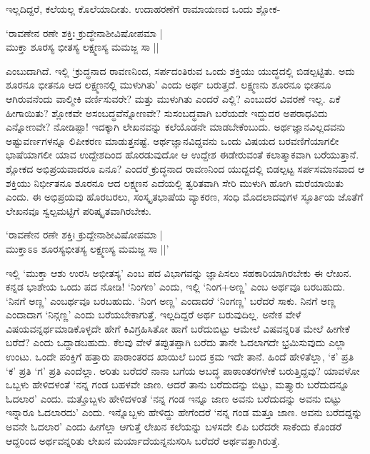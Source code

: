ಇಲ್ಲದಿದ್ದರೆ, ಕಲೆಯಲ್ಲ ಕೊಲೆಯಾದೀತು. ಉದಾಹರಣೆಗೆ ರಾಮಾಯಣದ ಒಂದು ಶ್ಲೋಕ-

\begin{shloka}
`ರಾವಣೇನ ರಣೇ ಶಕ್ತಿಃ ಕ್ರುದ್ಧೇನಾಶೀವಿಷೋಪಮಾ |\label{120}\\
ಮುಕ್ತಾ ಶೂರಸ್ಯ ಭೀತಸ್ಯ ಲಕ್ಷ್ಮಣಸ್ಯ ಮಮಜ್ಜ ಸಾ ||
\end{shloka}
ಎಂಬುದಾಗಿದೆ. ಇಲ್ಲಿ `ಕ್ರುದ್ಧನಾದ ರಾವಣನಿಂದ, ಸರ್ಪದಂತಿರುವ ಒಂದು ಶಕ್ತಿಯು ಯುದ್ಧದಲ್ಲಿ ಬಿಡಲ್ಪಟ್ಟಿತು. ಅದು ಶೂರನೂ ಭೀತನೂ ಆದ ಲಕ್ಷ್ಮಣನಲ್ಲಿ ಮುಳುಗಿತು' ಎಂದು ಅರ್ಥ ಬರುತ್ತದೆ. ಲಕ್ಷ್ಮಣನು ಶೂರನೂ ಭೀತನೂ ಆಗಿರುವನೆಂದು ವಾಲ್ಮೀಕಿ ವರ್ಣಿಸುವರೇ? ಮತ್ತು ಮುಳುಗಿತು ಎಂದರೆ ಎಲ್ಲಿ? ಎಂಬುದರ ವಿವರಣೆ ಇಲ್ಲ. ಏಕೆ ಹೀಗಾಯಿತು? ಶ್ಲೋಕವೇ ಅಸಂಬದ್ಧವೆನ್ನೋಣವೇ? ಸುಸಂಬದ್ಧವಾಗಿ ಬರೆಯದೇ ಇದ್ದುದರ ಅಪರಾಧವಿದು ಎನ್ನೋಣವೇ? ನೋಡಿಪ್ಪಾ! ಇದಕ್ಕಾಗಿ ಲೇಖನವನ್ನು ಕಲೆಯೊಡನೇ ಮಾಡಬೇಕೆಂಬುದು. ಅರ್ಥಜ್ಞಾನವಿಲ್ಲದವನು ಅಷ್ಟುವರ್ಣಗಳನ್ನೂ ಲಿಪೀಕರಣ ಮಾಡುತ್ತನಷ್ಟೆ. ಅರ್ಥಜ್ಞಾನವಿದ್ದವನು ಒಂದು ವಿಷಯದ ಬರವಣಿಗೆಯಾಗಲೀ ಭಾಷೆಯಾಗಲೀ ಯಾವ ಉದ್ದೇಶದಿಂದ  ಹೊರಡುವುದೋ ಆ ಉದ್ದೇಶ ಈಡೇರುವಂತೆ ಕಲಾತ್ಮಾಕವಾಗಿ ಬರೆಯುತ್ತಾನೆ. ಶ್ಲೋಕದ ಅಭಿಪ್ರಯವಾದರೂ ಏನೂ? ಎಂದರೆ ಕ್ರುದ್ಧನಾದ ರಾವಣನಿಂದ ಯುದ್ದದಲ್ಲಿ ಬಿಡಲ್ಪಟ್ಟ ಸರ್ಪಸಮಾನವಾದ ಆ ಶಕ್ತಿಯು ನಿರ್ಭೀತನೂ ಶೂರನೂ ಆದ ಲಕ್ಷ್ಮಣನ ಎದೆಯಲ್ಲಿ ತ್ವರಿತವಾಗಿ ಸೇರಿ ಮುಳುಗಿ ಹೋಗಿ ಮರೆಯಾಯಿತು ಎಂದು. ಈ ಅಭಿಪ್ರಯವು ಹೊರಬರಲು, ಸಂಸ್ಕೃತಭಾಷೆಯ ವ್ಯಾಕರಣ, ಸಂಧಿ ಮೊದಲಾದವುಗಳ ಸ್ಫೂರ್ತಿಯ ಜೊತೆಗೆ ಲೇಖನವೂ ಸ್ವಲ್ಪಮಟ್ಟಿಗೆ ಪರಿಷ್ಕೃತವಾಗಿರಬೇಕು.

\begin{shloka}
`ರಾವಣೇನ ರಣೇ ಶಕ್ತಿಃ ಕ್ರುದ್ದೇನಾಶೀವಿಷೋಪಮಾ |\\
ಮುಕ್ತಾಽಽ ಶೂರಸ್ಯಭೀತಸ್ಯ ಲಕ್ಷ್ಮಣಸ್ಯ ಮಮಜ್ಜ ಸಾ ||'
\end{shloka}
ಇಲ್ಲಿ `ಮುಕ್ತಾ ಆಶು ಉರಸಿ ಅಭೀತಸ್ಯ' ಎಂಬ ಪದ ವಿಭಾಗವನ್ನು ಜ್ಞಾಪಿಸಲು ಸಹಕಾರಿಯಾಗಿರಬೇಕು ಈ ಲೇಖನ. ಕನ್ನಡ ಭಾಶೇಯ ಒಂದು ಪದ ನೋಡಿ! `ನಿಂಗಣ' ಎಂದು, ಇಲ್ಲಿ  `ನಿಂಗ+ಅಣ್ಣ' ಎಂಬ ಅರ್ಥವೂ ಬರಬಹುದು. `ನಿನಗೆ ಅಣ್ಣ' ಎಂಬರ್ಥವೂ‌ ಬರಬಹುದು. `ನಿಂಗ ಅಣ್ಣ' ಎಂದಾದರೆ `ನಿಂಗಣ್ಣ' ಬರೆದರೆ ಸಾಕು. ನಿನಗೆ ಅಣ್ಣ ಎಂದಾದಾಗ `ನಿನ್ಗಣ್ಣ' ಎಂದು ಬರೆಯಬೇಕಾಗುತ್ತೆ. ಇಲ್ಲದಿದ್ದರೆ ಅರ್ಥ ಬರುವುದಿಲ್ಲ. ಅನೇಕ ವೇಳೆ ವಿಷಯವನ್ನರ್ಥಮಾಡಿಕೊಳ್ಳದೇ ಹೇಗೆ ಕಿವಿಗ್ರಹಿಸಿತೋ ಹಾಗೆ ಬರೆದುಬಿಟ್ಟು ಆಮೇಲೆ ವಿಷವನ್ನರಿತ ಮೇಲೆ ಹೀಗೇಕೆ ಬರೆದೆ? ಎಂದು ಒದ್ದಾಡಬಹುದು. ಕೆಲವು ವೇಳೆ ತಪ್ಪುತಪ್ಪಾಗಿ ಬರೆದು ತಾನೇ ಓದಲಾಗದೇ ಭ್ರಮಿಸುವುದು ಎಲ್ಲಾ ಉಂಟು. ಒಂದೇ ಪಂಕ್ತಿಗೆ ಹತ್ತಾರು ಪಾಠಾಂತರದ ಖಾಯಿಲೆ ಬಂದ ಕ್ರಮ ಇದೇ ತಾನೆ. ಹಿಂದೆ ಹೇಳಿತೆಲ್ಲಾ, `ಕ' ಪ್ರತಿ `ಕ' ಪ್ರತಿ `ಗ' ಪ್ರತಿ ಎಂದೆಲ್ಲಾ. ಅರಿತು ಬರೆದರೆ ನಾನಾ ಬಗೆಯ ಅಬದ್ಧ ಪಾಠಾಂತರಗಳೇಕೆ ಬರುತ್ತಿದ್ದವು? ಯಾವಳೋ ಒಬ್ಬಳು ಹೇಳಿದಳಂತೆ `ನನ್ನ ಗಂಡ ಬಹಳವೇ ಜಾಣ. ಆದರೆ ತಾನು ಬರೆದುದನ್ನು ಬಿಟ್ಟು, ಮತ್ತ್ಯಾರು ಬರೆದುದನ್ನೂ ಓದಲಾರ' ಎಂದು. ಮತ್ತೊಬ್ಬಳು ಹೇಳಿದಳಂತೆ `ನನ್ನ ಗಂಡ ಇನ್ನೂ ಜಾಣ ಅವನು ಬರೆದುದನ್ನು ಅವನು ಬಿಟ್ಟು ಇನ್ನಾರೂ ಓದಲಾರದು' ಎಂದು. ಇನ್ನೊಬ್ಬಳು ಹೇಳಿದ್ದು ಹೇಗೆಂದರೆ `ನನ್ನ ಗಂಡ ಮತ್ತೂ ಜಾಣ. ಅವನು ಬರೆದದ್ದನ್ನು ಅವನೇ ಓದಲಾರ' ಎಂದು ಹೀಗೆಲ್ಲಾ ಆಗುತ್ತೆ ಲೇಖನ ಕಲೆಯನ್ನು ಬಳಸದೇ ಲಿಪಿ ಬರೆದರೇ ಸಾಕೆಂದು ಕೊಂಡರೆ ಆದ್ದರಿಂದ ಅರ್ಥವನ್ನರಿತು ಲೇಖನ ಮರ್ಯಾದೆಯನ್ನನುಸರಿಸಿ ಬರೆದರೆ ಅರ್ಥವತ್ತಾಗಿರುತ್ತೆ.

